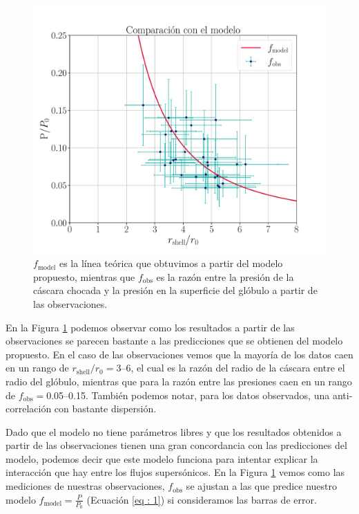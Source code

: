 \documentclass{book}
\begin{document}
\begin{figure}[htb]
    \centering
    \includegraphics[width=\textwidth]{imagenes_corregidas/Model.pdf}
    \caption{$f_\mathrm{model}$ es la línea teórica que obtuvimos a partir del modelo propuesto, mientras que $f_\mathrm{obs}$ es la razón entre la presión de la cáscara chocada  y la presión en la superficie del glóbulo a partir de las observaciones.}
    \label{Resultados_modelo}
\end{figure}

En la Figura \ref{Resultados_modelo} podemos observar como los resultados a partir de las observaciones se parecen bastante a las predicciones que se obtienen del modelo propuesto. En el caso de las observaciones vemos que la mayoría de los datos caen en un  rango de $r_\mathrm{shell}/r_0=$3--6, el cual es la razón del radio de la cáscara entre el radio del glóbulo, mientras que para la razón entre las presiones caen en un rango de $f_\mathrm{obs}=$0.05--0.15. También podemos notar, para los datos observados, una anti-correlación con bastante dispersión.

Dado que el modelo no tiene parámetros libres y que los resultados obtenidos a partir de las observaciones tienen una gran concordancia con las predicciones del modelo, podemos decir que este modelo funciona para intentar explicar la interacción que hay entre los flujos supersónicos. En la Figura \ref{Resultados_modelo} vemos como las mediciones de nuestras observaciones, $f_\mathrm{obs}$ se ajustan a las que predice nuestro modelo $f_\mathrm{model}=\frac{P}{P_0}$ (Ecuación \ref{eq : 1}) si consideramos las barras de error.
\end{document}
